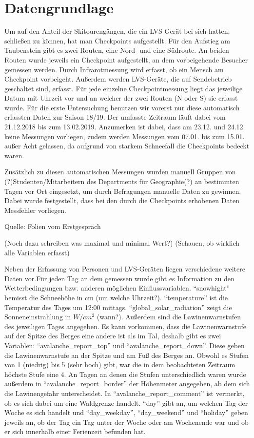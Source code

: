 \documentclass[11pt,a4paper]{report}
\begin{document}
\section{Datengrundlage}
Um auf den Anteil der Skitourengängen, die ein LVS-Gerät bei sich hatten, schließen zu können, hat man Checkpoints aufgestellt. Für den Aufstieg am Taubenstein gibt es zwei Routen, eine Nord- und eine Südroute. An beiden Routen wurde jeweils ein Checkpoint aufgestellt, an dem vorbeigehende Besucher gemessen werden. Durch Infrarotmessung wird erfasst, ob ein Mensch am Checkpoint vorbeigeht. Außerdem werden LVS-Geräte, die auf Sendebetrieb geschaltet sind, erfasst. Für jede einzelne Checkpointmessung liegt das jeweilige Datum mit Uhrzeit vor und an welcher der zwei Routen (N oder S) sie erfasst wurde.
Für die erste Untersuchung benutzen wir vorerst nur diese automatisch erfassten Daten zur Saison 18/19. Der umfasste Zeitraum läuft dabei vom 21.12.2018 bis zum 13.02.2019. Anzumerken ist dabei, dass am 23.12. und 24.12. keine Messungen vorliegen, zudem werden Messungen vom 07.01. bis zum 15.01. außer Acht gelassen, da aufgrund von starkem Schneefall die Checkpoints bedeckt waren.

Zusätzlich zu diesen automatischen Messungen wurden manuell Gruppen von (?)Studenten/Mitarbeitern des Departments für Geographie(?) an bestimmten Tagen vor Ort eingesetzt, um durch Befragungen manuelle Daten zu gewinnen. Dabei wurde festgestellt, dass bei den durch die Checkpoints erhobenen Daten Messfehler vorliegen.

Quelle:
Folien vom Erstgespräch

(Noch dazu schreiben was maximal und minimal Wert?)
(Schauen, ob wirklich alle Variablen erfasst)

Neben der Erfassung von Personen und LVS-Geräten liegen verschiedene weitere Daten vor.Für jeden Tag an dem gemessen wurde gibt es Information zu den Wetterbedingungen bzw. anderen möglichen Einflussvariablen. "`snowhight"' bemisst die Schneehöhe in cm (um welche Uhrzeit?). "`temperature"' ist die Temperatur des Tages um 12:00 mittags. "`global\_solar\_radiation"' zeigt die Sonneneinstrahlung in $W/cm^2$ (wann?). Außerdem sind die Lawinenwarnstufen des jeweiligen Tages angegeben. Es kann vorkommen, dass die Lawinenwarnstufe auf der Spitze des Berges eine andere ist als im Tal, deshalb gibt es zwei Variablen: "`avalanche\_report\_top"' und "`avalanche\_report\_down"'. Diese geben die Lawinenwarnstufe an der Spitze und am Fuß des Berges an. Obwohl es Stufen von 1 (niedrig) bis 5 (sehr hoch) gibt, war die in dem beobachteten Zeitraum höchste Stufe eine 4. An Tagen an denen die Stufen unterschiedlich waren wurde außerdem in "`avalanche\_report\_border"' der Höhenmeter angegeben, ab dem sich die Lawinengefahr unterscheidet. In "`avalanche\_report\_comment"' ist vermerkt, ob es sich dabei um eine Waldgrenze handelt. "`day"' gibt an, um welchen Tag der Woche es sich handelt und "`day\_weekday"', "`day\_weekend"' und "`holiday"' geben jeweils an, ob der Tag ein Tag unter der Woche oder am Wochenende war und ob er sich innerhalb einer Ferienzeit befunden hat.
\end{document}
